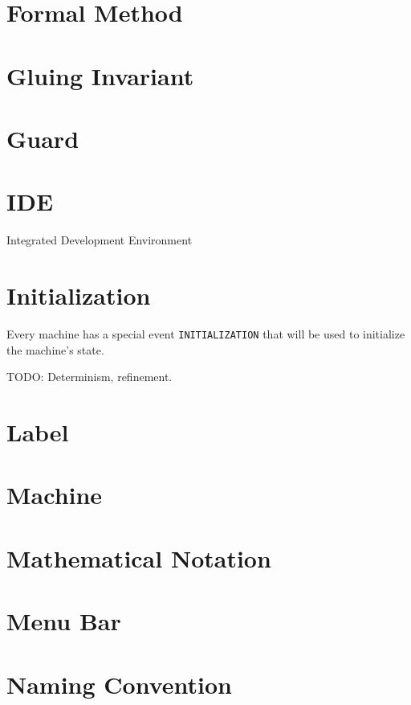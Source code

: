 \section{Formal Method}
\label{formal_method}

\section{Gluing Invariant}
\label{gluing_invariant}

\section{Guard}
\label{guard}

\section{IDE}
\label{ide}

Integrated Development Environment

\section{Initialization}
\label{initialization}

Every machine has a special event \texttt{INITIALIZATION} that will be used to initialize the machine's state.

TODO: Determinism, refinement.

\section{Label}
\label{label}

\section{Machine}
\label{machine}

\section{Mathematical Notation}
\label{mathematical_notation}

\section{Menu Bar}
\label{menu_bar}

\section{Naming Convention}
\label{naming_convention}

